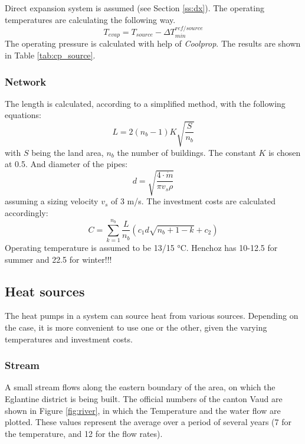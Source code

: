 \documentclass{article}
\begin{document}
Direct expansion system is assumed (see Section \ref{ss:dx}).
The operating temperatures are calculating the following way.
\begin{equation}
    T_{evap} = T_{source} - \Delta T_{min}^{ref/source}
\end{equation}
The operating pressure is calculated with help of \textit{Coolprop}. The results are shown in Table \ref{tab:cp_source}.


\subsubsection{Network}
The length is calculated, according to a simplified method\cite{girardinEnerGisGeographicalInformation2010}, with the following equations:
\begin{equation}
    L = 2(n_{b}-1)K\sqrt{\frac{S}{n_{b}}}
\end{equation}
with $S$ being the land area, $n_{b}$ the number of buildings. The constant $K$ is chosen at 0.5.
And diameter of the pipes:
\begin{equation}
    d = \sqrt{\frac{4\cdot \dot{m}}{\pi v_{s} \rho}}
\end{equation}
assuming a sizing velocity $v_{s}$ of 3 m/s.
The investment costs are calculated accordingly:
\begin{equation}
    C = \sum_{k=1}^{n_{b}} \frac{L}{n_{b}} (c_{1} d \sqrt{n_{b}+1-k} + c_{2})
\end{equation}
Operating temperature is assumed to be 13/15 \si{\celsius}.
Henchoz\cite{henchozPotentialRefrigerantBased} has 10-12.5 for summer and 22.5 for winter!!! 

\subsection{Heat sources}
The heat pumps in a system can source heat from various sources. Depending on the case, it is more convenient to use one or the other, given the varying temperatures and investment costs.

\subsubsection{Stream}
A small stream flows along the eastern boundary of the area, on which the Eglantine district is being built. The official numbers of the canton Vaud \cite{veillehydro-meteorologiqueducantondevaudMorgesRiviereDebit} are shown in Figure \ref{fig:river}, in which the Temperature and the water flow are plotted. These values represent the average over a period of several years (7 for the temperature, and 12 for the flow rates). 
\end{document}
